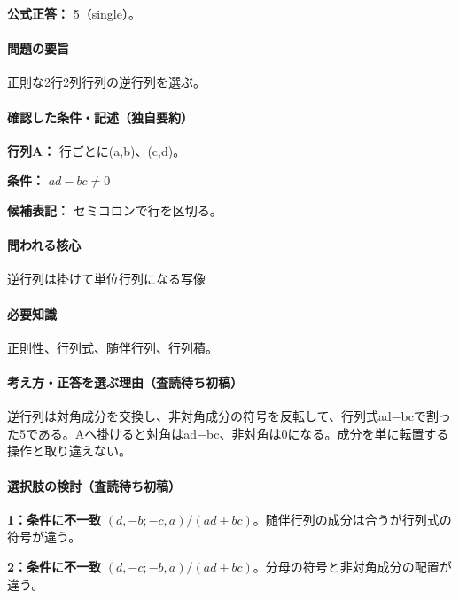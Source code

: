 \textbf{公式正答：} 5（single）。

\paragraph{問題の要旨} 正則な2行2列行列の逆行列を選ぶ。

\paragraph{確認した条件・記述（独自要約）}\mbox{}\par

\noindent\textbf{行列A：} 行ごとに(a,b)、(c,d)。\par

\noindent\textbf{条件：} \(ad-bc\neq0\)\par

\noindent\textbf{候補表記：} セミコロンで行を区切る。\par

\paragraph{問われる核心} 逆行列は掛けて単位行列になる写像

\paragraph{必要知識} 正則性、行列式、随伴行列、行列積。

\paragraph{考え方・正答を選ぶ理由（査読待ち初稿）} 逆行列は対角成分を交換し、非対角成分の符号を反転して、行列式ad−bcで割った5である。Aへ掛けると対角はad−bc、非対角は0になる。成分を単に転置する操作と取り違えない。

\paragraph{選択肢の検討（査読待ち初稿）}\mbox{}\par

\noindent\textbf{1：条件に不一致} \((d,-b;-c,a)/(ad+bc)\)。随伴行列の成分は合うが行列式の符号が違う。\par

\noindent\textbf{2：条件に不一致} \((d,-c;-b,a)/(ad+bc)\)。分母の符号と非対角成分の配置が違う。\par

